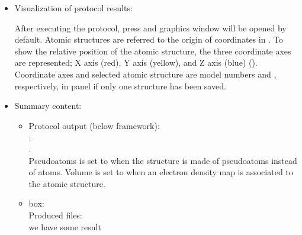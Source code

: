 \begin{itemize}
  

  \item Visualization of protocol results:
  
  After executing the protocol, press  and \chimera graphics window will be opened by default. 
  Atomic structures are referred to the origin of coordinates in \chimera . To show the relative position of the atomic structure, the three coordinate axes are represented; X axis (red), Y axis (yellow), and Z axis (blue) (). Coordinate axes and selected atomic structure  are model numbers  and , respectively, in \chimera {} panel if only one structure has been saved.
   
   \item Summary content:
    \begin{itemize}
     \item Protocol output (below \scipion framework):\\ ;\\
     .\\Pseudoatoms is set to  when the structure is made of pseudoatoms instead of atoms. Volume is set to  when an electron density map is associated to the atomic structure.
     \item {} box:\\Produced files:\\we have some result
    \end{itemize}
  
  \end{itemize}

  

